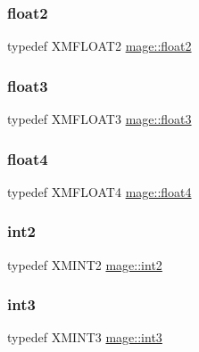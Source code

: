 \subsubsection{\texorpdfstring{float2}{float2}}
{\footnotesize\ttfamily typedef X\+M\+F\+L\+O\+A\+T2 \hyperlink{namespacemage_a536f5856288c280080c9cdf739e85ddc}{mage\+::float2}}

\hypertarget{namespacemage_aab5dae4b0aaf8129b9e0d651d91d4b38}{}\label{namespacemage_aab5dae4b0aaf8129b9e0d651d91d4b38} 
\subsubsection{\texorpdfstring{float3}{float3}}
{\footnotesize\ttfamily typedef X\+M\+F\+L\+O\+A\+T3 \hyperlink{namespacemage_aab5dae4b0aaf8129b9e0d651d91d4b38}{mage\+::float3}}

\hypertarget{namespacemage_aa79484ea5211c29727b3794199ac0a55}{}\label{namespacemage_aa79484ea5211c29727b3794199ac0a55} 
\subsubsection{\texorpdfstring{float4}{float4}}
{\footnotesize\ttfamily typedef X\+M\+F\+L\+O\+A\+T4 \hyperlink{namespacemage_aa79484ea5211c29727b3794199ac0a55}{mage\+::float4}}

\hypertarget{namespacemage_aa22600b49377872988582e782d7b1fcd}{}\label{namespacemage_aa22600b49377872988582e782d7b1fcd} 
\subsubsection{\texorpdfstring{int2}{int2}}
{\footnotesize\ttfamily typedef X\+M\+I\+N\+T2 \hyperlink{namespacemage_aa22600b49377872988582e782d7b1fcd}{mage\+::int2}}

\hypertarget{namespacemage_a80c7f9de83dfbbd55bbf339dbcbd99cc}{}\label{namespacemage_a80c7f9de83dfbbd55bbf339dbcbd99cc} 
\subsubsection{\texorpdfstring{int3}{int3}}
{\footnotesize\ttfamily typedef X\+M\+I\+N\+T3 \hyperlink{namespacemage_a80c7f9de83dfbbd55bbf339dbcbd99cc}{mage\+::int3}}

